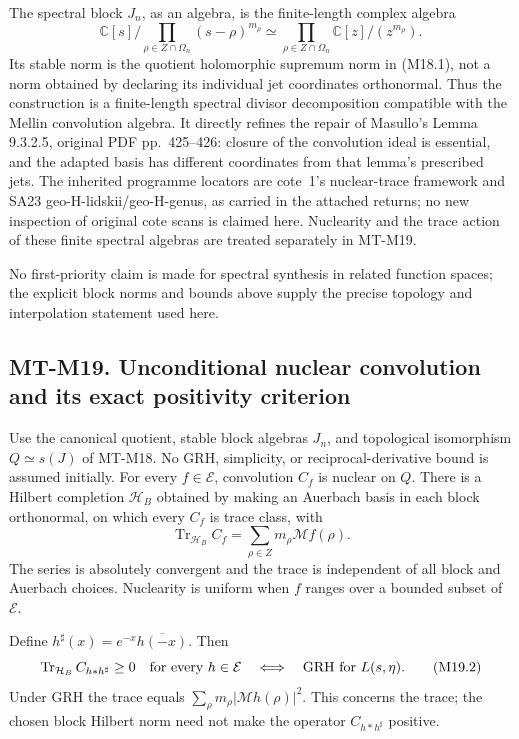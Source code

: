 The spectral block \(J_n\), as an algebra, is the
finite-length complex algebra
\[
 \mathbb C[s]\Big/
       \prod_{\rho\in Z\cap\Omega_n}(s-\rho)^{m_\rho}
 \simeq
 \prod_{\rho\in Z\cap\Omega_n}
                  \mathbb C[z]/(z^{m_\rho}).
\]
Its stable norm is the quotient holomorphic supremum
norm in (M18.1), not a norm obtained by declaring its
individual jet coordinates orthonormal.
Thus the construction is a finite-length spectral
divisor decomposition compatible with the Mellin
convolution algebra.  It directly refines the repair
of Masullo's Lemma 9.3.2.5, original PDF pp.~425--426:
closure of the convolution ideal is essential, and
the adapted basis has different coordinates from
that lemma's prescribed jets.  The inherited programme
locators are cote~1's nuclear-trace framework and
SA23 geo-H-lidskii/geo-H-genus, as carried in the
attached returns; no new inspection of original
cote scans is claimed here.  Nuclearity and the
trace action of these finite spectral algebras
are treated separately in MT-M19.

No first-priority claim is made for spectral synthesis in related
function spaces; the explicit block norms and bounds above supply
the precise topology and interpolation statement used here.



\subsection*{MT-M19. Unconditional nuclear convolution and its exact positivity criterion}
Use the canonical quotient, stable block algebras \(J_n\), and
topological isomorphism \(Q\simeq s(J)\) of MT-M18. No GRH,
simplicity, or reciprocal-derivative bound is assumed initially.
For every \(f\in\mathcal E\), convolution \(C_f\) is nuclear on
\(Q\). There is a Hilbert completion \(\mathcal H_B\) obtained
by making an Auerbach basis in each block orthonormal, on which
every \(C_f\) is trace class, with
\[
 \operatorname{Tr}_{\mathcal H_B} C_f
       =\sum_{\rho\in Z}m_\rho\mathcal Mf(\rho).       \tag{M19.1}
\]
The series is absolutely convergent and the trace is independent
of all block and Auerbach choices. Nuclearity is uniform when
\(f\) ranges over a bounded subset of \(\mathcal E\).

Define \(h^\sharp(x)=e^{-x}\overline{h(-x)}\). Then
\[
 \operatorname{Tr}_{\mathcal H_B} C_{h*h^\sharp}\ge0
          \quad\hbox{for every }h\in\mathcal E
 \quad\Longleftrightarrow\quad
 \text{GRH for }L(s,\eta).                              \tag{M19.2}
\]
Under GRH the trace equals
\(\sum_\rho m_\rho|\mathcal Mh(\rho)|^2\).
This concerns the trace; the chosen block Hilbert norm need
not make the operator \(C_{h*h^\sharp}\) positive.

